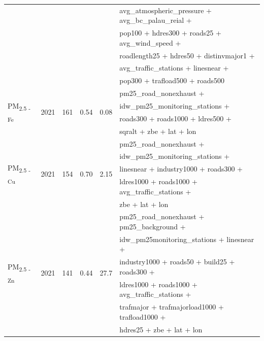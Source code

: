 \documentclass{article}
\begin{document}
\begin{samepage}
\begin{table}[!htbp]
\begin{threeparttable}
\begin{tabular}{llllll}
& & & & & avg\_atmospheric\_pressure + avg\_bc\_palau\_reial +   \\ 
& & & & &  pop100 + hdres300 + roads25 + avg\_wind\_speed +  \\
& & & & & roadlength25 + hdres50 + distinvmajor1 +  \\
& & & & & avg\_traffic\_stations + linesnear + \\
& & & & & pop300 + trafload500 + roads500 \\
\midrule
\multirow{4}{*}{PM\textsubscript{2.5 - Fe}} & \multirow{4}{*}{2021} & \multirow{4}{*}{161}  & \multirow{4}{*}{0.54} & \multirow{4}{*}{0.08} & pm25\_road\_nonexhaust + \\ 
& & & & & idw\_pm25\_monitoring\_stations + \\
& & & & & roads300 + roads1000 + ldres500 + \\
& & & & & sqralt + zbe + lat + lon \\
\midrule
\multirow{5}{*}{PM\textsubscript{2.5 - Cu}} & \multirow{5}{*}{2021} & \multirow{5}{*}{154} & \multirow{5}{*}{0.70} & \multirow{5}{*}{2.15} & pm25\_road\_nonexhaust + \\
& & & & & idw\_pm25\_monitoring\_stations + \\
& & & & & linesnear + industry1000 + roads300 + \\
& & & & & ldres1000 + roads1000 + avg\_traffic\_stations + \\
& & & & &  zbe + lat + lon \\
\midrule
\multirow{6}{*}{PM\textsubscript{2.5 - Zn}} &\multirow{6}{*}{2021} & \multirow{6}{*}{141} & \multirow{6}{*}{0.44} & \multirow{6}{*}{27.7} & pm25\_road\_nonexhaust + pm25\_background + \\
& & & & & idw\_pm25monitoring\_stations + linesnear + \\
& & & & & industry1000 + roads50 + build25 + roads300 + \\
& & & & & ldres1000 + roads1000 + avg\_traffic\_stations + \\
& & & & & trafmajor + trafmajorload1000 +  trafload1000 +\\
& & & & & hdres25 + zbe + lat + lon \\
\bottomrule
\end{tabular}
\begin{tablenotes}
\scriptsize

\end{tablenotes}
\end{threeparttable}
\end{table}
\end{samepage}
\end{document}
